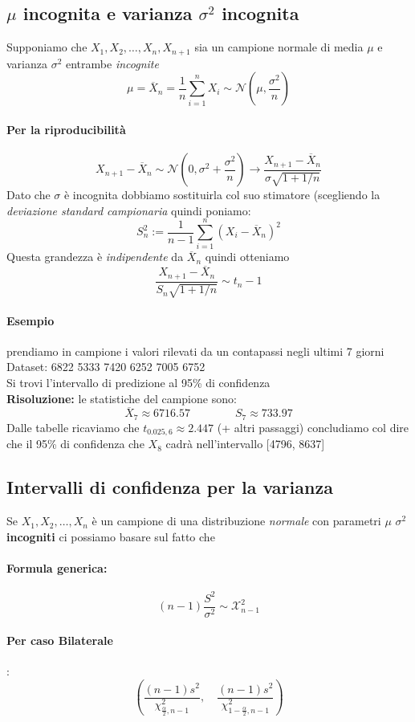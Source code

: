 \documentclass[]{article}
\newcommand{\formula}{\paragraph{Formula generica:}}
\begin{document}
    \subsection{$\mu$ incognita e varianza $\sigma^2$ incognita}
    Supponiamo che $X_1, X_2, \ldots, X_n, X_{n+1}$ sia un campione normale di media $\mu$ e varianza $\sigma^2$ entrambe \textit{incognite}
    \[ \mu = \overline{X}_n = \frac{1}{n} \sum_{i = 1}^{n} X_i \sim \mathcal{N}(\mu, \frac{\sigma^2}{n})  \]
    \paragraph{Per la riproducibilità}
    \[ X_{n+1} - \overline{X}_n \sim \mathcal{N}(0, \sigma^2 + \frac{\sigma^2}{n}) \longrightarrow \frac{X_{n+1} - \overline{X}_n}{\sigma \sqrt{1+1 /n}} \]
    Dato che $\sigma$ è incognita dobbiamo sostituirla col suo stimatore (scegliendo la \textit{deviazione standard campionaria} quindi poniamo:
    \[ S^2_n := \frac{1}{n -1} \sum_{i= 1}^{n} (X_i - \overline{X}_n)^2 \]
    Questa grandezza è \textit{indipendente} da $\overline{X}_n$ quindi otteniamo
    \[ \frac{X_{n+1} - \overline{X}_n}{S_n \sqrt{1+1/n}} \sim t_n - 1 \]
    \paragraph{Esempio} prendiamo in campione i valori rilevati da un contapassi negli ultimi 7 giorni \\
    Dataset: 6822 5333 7420 6252 7005 6752 \\
    Si trovi l'intervallo di predizione al 95\% di confidenza \\
    \textbf{Risoluzione:} le statistiche del campione sono:
    \[ \overline{X}_7 \approx 6716.57 \qquad \qquad S_7 \approx 733.97 \]
    Dalle tabelle ricaviamo che $t_{0.025,6} \approx 2.447$ (+ altri passaggi) concludiamo col dire che il 95\% di confidenza che $X_8$ cadrà nell'intervallo [4796, 8637]
    \subsection{Intervalli di confidenza per la varianza} 
    Se $X_1, X_2, \ldots, X_n$ è un campione di una distribuzione \textit{normale} con parametri $\mu$ $\sigma^2$ \textbf{incogniti} ci possiamo basare sul fatto che
    \formula \[ (n-1) \frac{S^2}{\sigma^2} \sim \mathcal{X}^2_{n-1}  \]
    \paragraph{Per caso Bilaterale}:
    \begin{equation}
        \left(\frac{(n-1) s^2}{\chi_{\frac{\alpha}{2}, n-1}^2}, \quad \frac{(n-1) s^2}{\chi_{1-\frac{\alpha}{2}, n-1}^2}\right)
    \end{equation}
\end{document}
